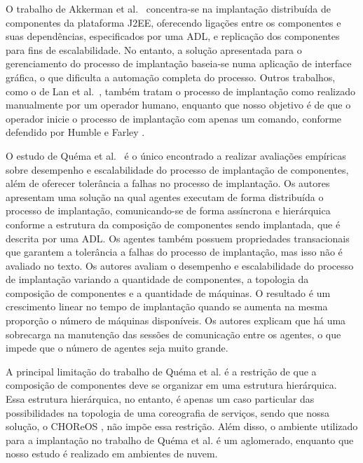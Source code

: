 O trabalho de Akkerman et al.~\cite{Akkerman2005J2EE} concentra-se na implantação distribuída de componentes da plataforma J2EE, oferecendo ligações entre os componentes e suas dependências, especificados por uma ADL, e replicação dos componentes para fins de escalabilidade. No entanto, a solução apresentada para o gerenciamento do processo de implantação baseia-se numa aplicação de interface gráfica, o que dificulta a automação completa do processo. Outros trabalhos, como o de Lan et al.~\cite{Lan2005Architecture}, também tratam o processo de implantação como realizado manualmente por um operador humano, enquanto que nosso objetivo é de que o operador inicie o processo de implantação com apenas um comando, conforme defendido por Humble e Farley \cite{Humble2011Continuous}.

O estudo de Quéma et al.~\cite{quema2004hierarchical} é o único encontrado a realizar avaliações empíricas sobre desempenho e escalabilidade do processo de implantação de componentes, além de oferecer tolerância a falhas no processo de implantação. Os autores apresentam uma solução na qual agentes executam de forma distribuída o processo de implantação, comunicando-se de forma assíncrona e hierárquica conforme a estrutura da composição de componentes sendo implantada, que é descrita por uma ADL. Os agentes também possuem propriedades transacionais que garantem a tolerância a falhas do processo de implantação, mas isso não é avaliado no texto. 
Os autores avaliam o desempenho e escalabilidade do processo de implantação variando a quantidade de componentes, a topologia da composição de componentes e a quantidade de máquinas. O resultado é um crescimento linear no tempo de implantação quando se aumenta na mesma proporção o número de máquinas disponíveis. Os autores explicam que há uma sobrecarga na manutenção das sessões de comunicação entre os agentes, o que impede que o número de agentes seja muito grande. 

A principal limitação do trabalho de Quéma et al. é a restrição de que a composição de componentes deve se organizar em uma estrutura hierárquica. Essa estrutura hierárquica, no entanto, é apenas um caso particular das possibilidades na topologia de uma coreografia de serviços, sendo que nossa solução, o CHOReOS \ee, não impõe essa restrição. Além disso, o ambiente utilizado para a implantação no trabalho de Quéma et al. é um aglomerado, enquanto que nosso estudo é realizado em ambientes de nuvem.

